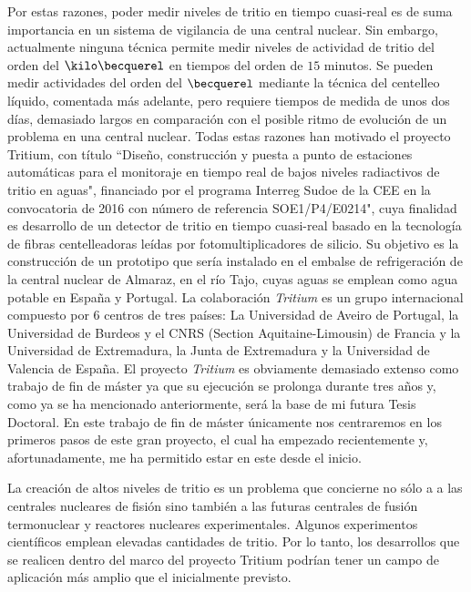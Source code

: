 Por estas razones, poder medir niveles de tritio en tiempo cuasi-real es de suma importancia en un sistema de vigilancia de una central nuclear. Sin embargo, actualmente ninguna técnica permite medir niveles de actividad de tritio del orden del $\kilo\becquerel$ en tiempos del orden de $15$ minutos.   Se pueden medir actividades  del orden del $\becquerel$  mediante la técnica del centelleo líquido, comentada más adelante, pero requiere tiempos de medida de unos dos días, demasiado largos en comparación con el posible ritmo de evolución de un problema en una central nuclear.   Todas estas razones han motivado el proyecto Tritium, con título ``Diseño, construcción y puesta a punto de estaciones automáticas para el monitoraje en tiempo real de bajos niveles radiactivos de tritio en aguas",  financiado por el programa Interreg Sudoe de la CEE en la convocatoria de 2016 con número de referencia  SOE1/P4/E0214", cuya finalidad es desarrollo de un detector de tritio en tiempo cuasi-real basado en la tecnología de fibras centelleadoras leídas por fotomultiplicadores de silicio. Su objetivo es la construcción de un prototipo que sería instalado en el embalse de refrigeración de la central nuclear de Almaraz, en el río Tajo, cuyas aguas se emplean como agua potable en España y Portugal.
La colaboración \textit{Tritium} es un grupo internacional compuesto por 6 centros de tres países:  La Universidad de Aveiro de Portugal,  la Universidad de Burdeos y el CNRS (Section Aquitaine-Limousin)  de Francia y  la Universidad de Extremadura, la Junta de Extremadura y la Universidad de Valencia de España. El proyecto \textit{Tritium} es  obviamente demasiado extenso como trabajo de fin de máster ya que  su ejecución se prolonga durante tres  años  y, como ya se ha mencionado anteriormente, será la base de mi futura Tesis Doctoral. En este trabajo de fin de máster únicamente nos centraremos en los primeros pasos de este gran proyecto, el cual ha empezado recientemente y, afortunadamente, me ha permitido estar en este desde el inicio.









La creación de altos niveles de tritio es un problema que concierne no sólo a  a las  centrales nucleares de fisión sino también a las  futuras centrales de fusión termonuclear y reactores nucleares experimentales. Algunos experimentos científicos emplean elevadas cantidades de tritio. Por lo tanto, los desarrollos que se realicen dentro del marco del proyecto Tritium podrían tener un campo de aplicación más amplio que el inicialmente previsto.


